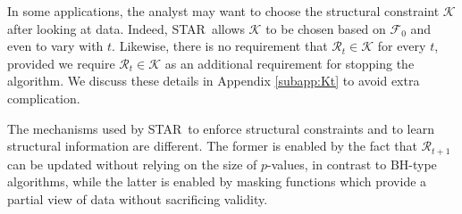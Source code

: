 \documentclass{biometrika}
\newcommand{\cF}{\mathcal{F}}
\newcommand{\cR}{\mathcal{R}}
\newcommand{\cK}{\mathcal{K}}
\renewcommand{\star}{STAR}
\newcommand{\bh}{BH}
\newcommand{\1}{\mathbf{1}}
\begin{document}
\begin{remark}
  In some applications, the analyst may want to choose the structural constraint $\cK$ after looking at data. Indeed, \star ~allows $\cK$ to be chosen based on $\cF_{0}$ and even to vary with $t$. Likewise, there is no requirement that $\cR_t \in \cK$ for every $t$, provided we require $\cR_t \in \cK$ as an additional requirement for stopping the algorithm. We discuss these details in Appendix \ref{subapp:Kt} to avoid extra complication.
\end{remark}

The mechanisms used by \star ~to enforce structural constraints and to learn structural information are different. The former is enabled by the fact that $\cR_{t+1}$ can be updated without relying on the size of $p$-values, in contrast to \bh -type algorithms, while the latter is enabled by masking functions which provide a partial view of data without sacrificing validity.
\end{document}

